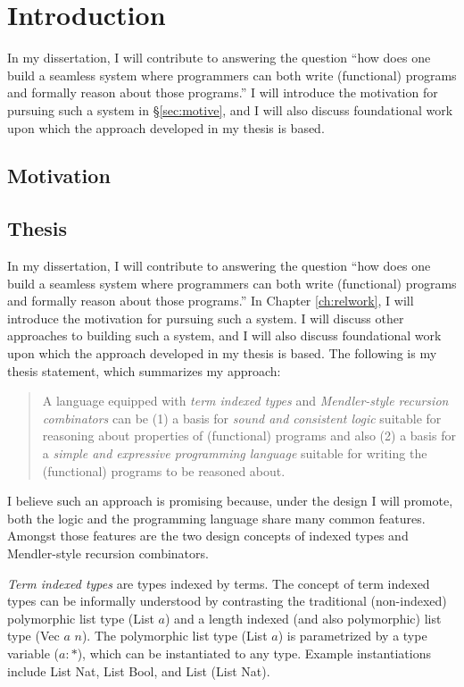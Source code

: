\chapter{Introduction}\label{ch:intro}
In my dissertation, I will contribute to answering the question
``how does one build a seamless system where programmers
can both write (functional) programs
and formally reason about those programs.''
I will introduce the motivation for pursuing such a system
in \S\ref{sec:motive},
and I will also discuss foundational work upon which
the approach developed in my thesis is based.


\section{Motivation} \label{sec:motiv}

\section{Thesis}
In my dissertation, I will contribute to answering the question
``how does one build a seamless system where programmers
can both write (functional) programs
and formally reason about those programs.'' In Chapter \ref{ch:relwork},
I will introduce the motivation for pursuing such a system.
I will discuss other approaches to building such a system,
and I will also discuss foundational work upon which
the approach developed in my thesis is based.
The following is my thesis statement, which summarizes my
approach:
\begin{quote}
A language equipped with \emph{term indexed types} and
\emph{Mendler-style recursion combinators} can be 
(1) a basis for \emph{sound and consistent logic}
suitable for reasoning about properties of (functional) programs
and also
(2) a basis for a \emph{simple and expressive programming language}
suitable for writing the (functional) programs to be reasoned about.
\end{quote}

I believe such an approach is promising because, under the design I will
promote, both the logic and the programming language share many
common features. Amongst those features are the two design concepts
of indexed types and Mendler-style recursion combinators.

\emph{Term indexed types} are types indexed by terms. The concept of
term indexed types can be informally understood by contrasting the traditional
(non-indexed) polymorphic list type (\textsf{List} $a$) and a length indexed
(and also polymorphic) list type (\textsf{Vec} $a$ $n$). The polymorphic list
type (\textsf{List} $a$) is parametrized by a type variable ($a:*$), which can
be instantiated to any type. Example instantiations include \textsf{List Nat},
\textsf{List Bool}, and \textsf{List} (\textsf{List Nat}).

